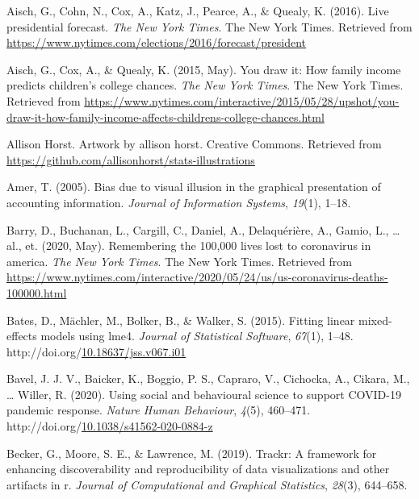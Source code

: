 \documentclass[print]{nuthesis}
\newlength{\cslhangindent}
\newenvironment{CSLReferences}%
{\setlength{\parindent}{0pt}%
\everypar{\setlength{\hangindent}{\cslhangindent}}\ignorespaces}%
{\par}
\begin{document}
\hypertarget{refs}{}
\begin{CSLReferences}{1}{0}
\leavevmode{}%
Aisch, G., Cohn, N., Cox, A., Katz, J., Pearce, A., \& Quealy, K. (2016). Live presidential forecast. \emph{The New York Times}. The New York Times. Retrieved from \url{https://www.nytimes.com/elections/2016/forecast/president}

\leavevmode{}%
Aisch, G., Cox, A., \& Quealy, K. (2015, May). You draw it: How family income predicts children's college chances. \emph{The New York Times}. The New York Times. Retrieved from \url{https://www.nytimes.com/interactive/2015/05/28/upshot/you-draw-it-how-family-income-affects-childrens-college-chances.html}

\leavevmode{}%
Allison Horst. Artwork by allison horst. Creative Commons. Retrieved from \url{https://github.com/allisonhorst/stats-illustrations}

\leavevmode{}%
Amer, T. (2005). Bias due to visual illusion in the graphical presentation of accounting information. \emph{Journal of Information Systems}, \emph{19}(1), 1--18.

\leavevmode{}%
Barry, D., Buchanan, L., Cargill, C., Daniel, A., Delaquérière, A., Gamio, L., \ldots{} al., et. (2020, May). Remembering the 100,000 lives lost to coronavirus in america. \emph{The New York Times}. The New York Times. Retrieved from \url{https://www.nytimes.com/interactive/2020/05/24/us/us-coronavirus-deaths-100000.html}

\leavevmode{}%
Bates, D., Mächler, M., Bolker, B., \& Walker, S. (2015). Fitting linear mixed-effects models using {lme4}. \emph{Journal of Statistical Software}, \emph{67}(1), 1--48. http://doi.org/\href{https://doi.org/10.18637/jss.v067.i01}{10.18637/jss.v067.i01}

\leavevmode{}%
Bavel, J. J. V., Baicker, K., Boggio, P. S., Capraro, V., Cichocka, A., Cikara, M., \ldots{} Willer, R. (2020). Using social and behavioural science to support {COVID}-19 pandemic response. \emph{Nature Human Behaviour}, \emph{4}(5), 460--471. http://doi.org/\href{https://doi.org/10.1038/s41562-020-0884-z}{10.1038/s41562-020-0884-z}

\leavevmode{}%
Becker, G., Moore, S. E., \& Lawrence, M. (2019). Trackr: A framework for enhancing discoverability and reproducibility of data visualizations and other artifacts in r. \emph{Journal of Computational and Graphical Statistics}, \emph{28}(3), 644--658.


\end{CSLReferences}
\end{document}
